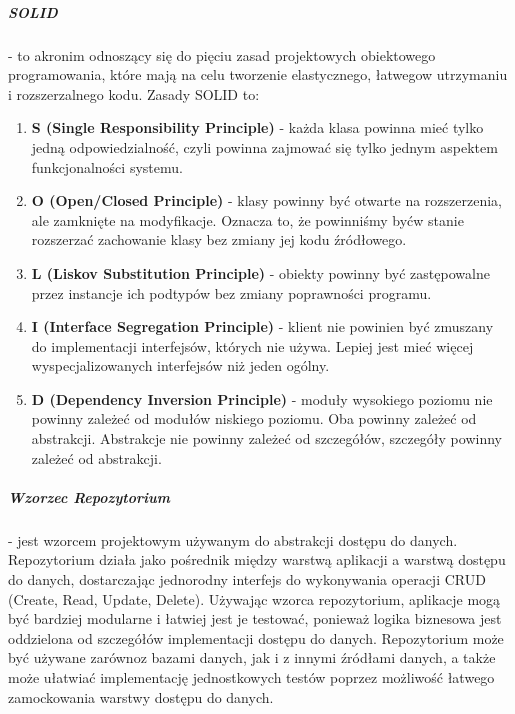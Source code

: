\subparagraph{SOLID} - to akronim odnoszący się do pięciu zasad projektowych obiektowego programowania, które mają na celu tworzenie elastycznego, łatwego\linebreak w utrzymaniu i rozszerzalnego kodu. Zasady SOLID to:
\begin{enumerate}
\item {\bf S (Single Responsibility Principle)} - każda klasa powinna mieć tylko jedną odpowiedzialność, czyli powinna zajmować się tylko jednym aspektem funkcjonalności systemu.
\item {\bf O (Open/Closed Principle)} - klasy powinny być otwarte na rozszerzenia, ale zamknięte na modyfikacje. Oznacza to, że powinniśmy być\linebreak w stanie rozszerzać zachowanie klasy bez zmiany jej kodu źródłowego.
\item {\bf L (Liskov Substitution Principle)} - obiekty powinny być zastępowalne przez instancje ich podtypów bez zmiany poprawności programu.
\item {\bf I (Interface Segregation Principle)} - klient nie powinien być zmuszany do implementacji interfejsów, których nie używa. Lepiej jest mieć więcej wyspecjalizowanych interfejsów niż jeden ogólny.
\item {\bf D (Dependency Inversion Principle)} - moduły wysokiego poziomu nie powinny zależeć od modułów niskiego poziomu. Oba powinny zależeć od abstrakcji. Abstrakcje nie powinny zależeć od szczegółów, szczegóły powinny zależeć od abstrakcji.
\end{enumerate}

\subparagraph{Wzorzec Repozytorium} - jest wzorcem projektowym używanym do abstrakcji dostępu do danych. Repozytorium działa jako pośrednik między warstwą aplikacji a warstwą dostępu do danych, dostarczając jednorodny interfejs do wykonywania operacji CRUD (Create, Read, Update, Delete). Używając wzorca repozytorium, aplikacje mogą być bardziej modularne i łatwiej jest je testować, ponieważ logika biznesowa jest oddzielona od szczegółów implementacji dostępu do danych. Repozytorium może być używane zarówno\linebreak z bazami danych, jak i z innymi źródłami danych, a także może ułatwiać implementację jednostkowych testów poprzez możliwość łatwego zamockowania warstwy dostępu do danych.

